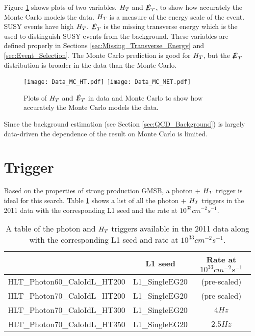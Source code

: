 Figure \ref{fig:Data_vs_MC} shows plots of two variables, $H_{T}$ and $\slashed{E}_{T}$,  to 
show how accurately the Monte Carlo models the data. $H_{T}$ is a measure of the 
energy scale of the event. SUSY events have high $H_{T}$. $\slashed{E}_{T}$ is the missing
transverse energy which is the used to distinguish SUSY events from the
background. These variables are defined properly in Sections
\ref{sec:Missing_Transverse_Energy} and \ref{sec:Event_Selection}. The Monte 
Carlo prediction is good for $H_{T}$, but the $\slashed{E}_{T}$ distribution is broader in 
the data than the Monte Carlo. \\

\begin{figure}
\texttt{[image: Data\_MC\_HT.pdf]}
\texttt{[image: Data\_MC\_MET.pdf]}
\caption{Plots of $H_{T}$ and $\slashed{E}_{T}$ in data and Monte Carlo to show how accurately
the Monte Carlo models the data.}
\label{fig:Data_vs_MC}
\end{figure}

Since the background estimation (see Section \ref{sec:QCD_Background}) is 
largely data-driven the dependence of the result on Monte Carlo is limited.

\section{Trigger}

Based on the properties of strong production GMSB, a photon + $H_{T}$ trigger 
is ideal for this search. Table \ref{tab:Triggers} shows a list of all the 
photon + $H_{T}$ triggers in the 2011 data with the corresponding L1 seed and the
rate at $10^{33}\unit{cm^{-2}s^{-1}}$. \\

\begin{table}
\begin{center}
\begin{tabular}{|l|c|c|}
\hline
 & L1 seed & Rate at $10^{33}\unit{cm^{-2}s^{-1}}$ \\
\hline
HLT\_Photon60\_CaloIdL\_HT200 & L1\_SingleEG20 & (pre-scaled) \\
HLT\_Photon70\_CaloIdL\_HT200 & L1\_SingleEG20 & (pre-scaled) \\
HLT\_Photon70\_CaloIdL\_HT300 & L1\_SingleEG20 & $4\unit{Hz}$ \\
HLT\_Photon70\_CaloIdL\_HT350 & L1\_SingleEG20 & $2.5\unit{Hz}$ \\
\hline
\end{tabular}
\end{center}
\caption{A table of the photon and $H_{T}$ triggers available in the 2011 data
along with the corresponding L1 seed and rate at $10^{33}\unit{cm^{-2}s^{-1}}$.}
\label{tab:Triggers}
\end{table}

